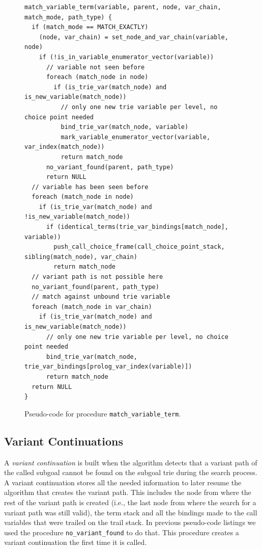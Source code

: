 \begin{figure}[ht]
\begin{Verbatim}
match_variable_term(variable, parent, node, var_chain, match_mode, path_type) {
  if (match_mode == MATCH_EXACTLY)
    (node, var_chain) = set_node_and_var_chain(variable, node)
    if (!is_in_variable_enumerator_vector(variable))
      // variable not seen before
      foreach (match_node in node)
        if (is_trie_var(match_node) and is_new_variable(match_node))
          // only one new trie variable per level, no choice point needed
          bind_trie_var(match_node, variable)
          mark_variable_enumerator_vector(variable, var_index(match_node))
          return match_node
      no_variant_found(parent, path_type)
      return NULL
  // variable has been seen before
  foreach (match_node in node)
    if (is_trie_var(match_node) and !is_new_variable(match_node))
      if (identical_terms(trie_var_bindings[match_node], variable))
        push_call_choice_frame(call_choice_point_stack, sibling(match_node), var_chain)
        return match_node
  // variant path is not possible here
  no_variant_found(parent, path_type)
  // match against unbound trie variable
  foreach (match_node in var_chain)
    if (is_trie_var(match_node) and is_new_variable(match_node))
      // only one new trie variable per level, no choice point needed
      bind_trie_var(match_node, trie_var_bindings[prolog_var_index(variable)])
      return match_node
  return NULL
}
\end{Verbatim}
\caption{Pseudo-code for procedure \texttt{match\_variable\_term}.}
\label{fig:match_variable}
\end{figure}

\subsection{Variant Continuations}

A \textit{variant continuation} is built when the algorithm detects that a variant path of the
called subgoal cannot be found on the subgoal trie during the search process.
A variant continuation stores all the needed information to later resume
the algorithm that creates the variant path. This includes the node from where the rest of the variant
path is created (i.e., the last node from where the search for a variant path was still valid),
the term stack and all the bindings made to the call variables that were trailed on the trail stack.
In previous pseudo-code listings we used the procedure \texttt{no\_variant\_found} to do that.
This procedure creates a variant continuation the first time it is called.

